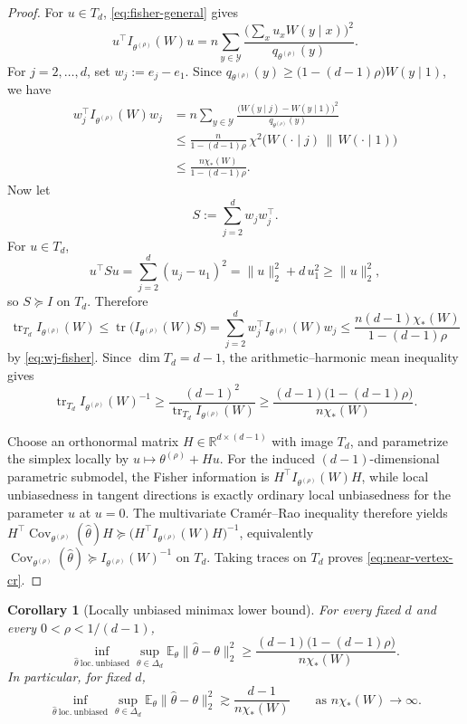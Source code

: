 \documentclass[11pt]{amsart}
\numberwithin{equation}{section}
\newtheorem{corollary}[theorem]{Corollary}
\theoremstyle{definition}
\newcommand{\R}{\mathbb R}
\newcommand{\E}{\mathbb E}
\DeclareMathOperator{\Cov}{Cov}
\begin{document}
\begin{proof}
For \(u\in T_d\), \eqref{eq:fisher-general} gives
\[
u^\top I_{\theta^{(\rho)}}(W)u
=
n\sum_{y\in\mathcal Y}
\frac{\bigl(\sum_x u_x W(y\mid x)\bigr)^2}{q_{\theta^{(\rho)}}(y)}.
\]
For \(j=2,\dots,d\), set \(w_j:=e_j-e_1\).
Since
\(
q_{\theta^{(\rho)}}(y)\ge \bigl(1-(d-1)\rho\bigr)W(y\mid 1)
\),
we have
\[
\begin{aligned}
w_j^\top I_{\theta^{(\rho)}}(W) w_j
&=
n\sum_{y\in\mathcal Y}
\frac{\bigl(W(y\mid j)-W(y\mid 1)\bigr)^2}{q_{\theta^{(\rho)}}(y)}\\
&\le
\frac{n}{1-(d-1)\rho}\,
\chi^2\!\bigl(W(\cdot\mid j)\,\|\,W(\cdot\mid 1)\bigr)\\
&\le
\frac{n\chi_\ast(W)}{1-(d-1)\rho}.
\end{aligned} \tag{8.3}\label{eq:wj-fisher}
\]
Now let
\[
S:=\sum_{j=2}^d w_j w_j^\top.
\]
For \(u\in T_d\),
\[
u^\top S u
=
\sum_{j=2}^d (u_j-u_1)^2
=
\|u\|_2^2+d\,u_1^2
\ge
\|u\|_2^2,
\]
so \(S\succeq I\) on \(T_d\).  Therefore
\[
\operatorname{tr}_{T_d} I_{\theta^{(\rho)}}(W)
\le
\operatorname{tr}\!\bigl(I_{\theta^{(\rho)}}(W)S\bigr)
=
\sum_{j=2}^d w_j^\top I_{\theta^{(\rho)}}(W)w_j
\le
\frac{n(d-1)\chi_\ast(W)}{1-(d-1)\rho}
\]
by \eqref{eq:wj-fisher}.  Since \(\dim T_d=d-1\), the arithmetic--harmonic mean inequality gives
\[
\operatorname{tr}_{T_d} I_{\theta^{(\rho)}}(W)^{-1}
\ge
\frac{(d-1)^2}{\operatorname{tr}_{T_d} I_{\theta^{(\rho)}}(W)}
\ge
\frac{(d-1)\bigl(1-(d-1)\rho\bigr)}{n\chi_\ast(W)}.
\]

Choose an orthonormal matrix \(H\in\R^{d\times(d-1)}\) with image \(T_d\), and parametrize the simplex
locally by
\(
u\mapsto \theta^{(\rho)}+Hu
\).
For the induced \((d-1)\)-dimensional parametric submodel, the Fisher information is
\(H^\top I_{\theta^{(\rho)}}(W)H\), while local unbiasedness in tangent directions is exactly ordinary
local unbiasedness for the parameter \(u\) at \(u=0\).
The multivariate Cram\'er--Rao inequality therefore yields
\(
H^\top \Cov_{\theta^{(\rho)}}(\widehat\theta)H \succeq
\bigl(H^\top I_{\theta^{(\rho)}}(W)H\bigr)^{-1}
\),
equivalently
\(
\Cov_{\theta^{(\rho)}}(\widehat\theta)\succeq I_{\theta^{(\rho)}}(W)^{-1}
\)
on \(T_d\).
Taking traces on \(T_d\) proves \eqref{eq:near-vertex-cr}.
\end{proof}

\begin{corollary}[Locally unbiased minimax lower bound]\label{cor:local-minimax}
For every fixed \(d\) and every \(0<\rho<1/(d-1)\),
\[
\inf_{\widehat\theta\ \mathrm{loc.\ unbiased}}
\sup_{\theta\in\Delta_d}
\E_\theta\|\widehat\theta-\theta\|_2^2
\ge
\frac{(d-1)\bigl(1-(d-1)\rho\bigr)}{n\chi_\ast(W)}.
\]
In particular, for fixed \(d\),
\[
\inf_{\widehat\theta\ \mathrm{loc.\ unbiased}}
\sup_{\theta\in\Delta_d}
\E_\theta\|\widehat\theta-\theta\|_2^2
\gtrsim
\frac{d-1}{n\chi_\ast(W)}
\qquad\text{as } n\chi_\ast(W)\to\infty.
\]
\end{corollary}
\end{document}
